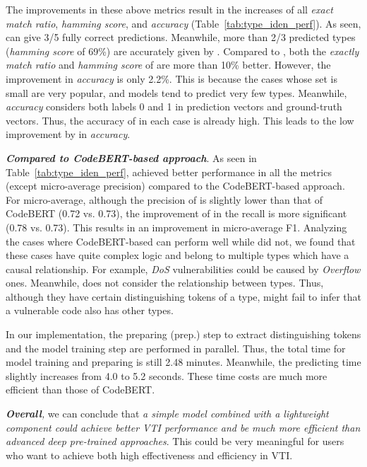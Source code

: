 The improvements in these above metrics result in the increases of all \textit{exact match ratio}, \textit{hamming score}, and \textit{accuracy} (Table~\ref{tab:type_iden_perf}).
%
As seen, \ebase can give 3/5 fully correct predictions. Meanwhile, more than 2/3 predicted types (\textit{hamming score} of 69\%) are accurately given by \ebase. Compared to \base, both the \textit{exactly match ratio} and \textit{hamming score} of \ebase are more than 10\% better. However, the improvement in \textit{accuracy} is only 2.2\%. This is because the cases whose \vt set is small are very popular, and models tend to predict very few types. Meanwhile, \textit{accuracy} considers both labels 0 and 1 in prediction vectors and ground-truth vectors. Thus, the accuracy of \base in each case is already high. This leads to the low improvement by \ebase in \textit{accuracy}.


\textbf{\textit{Compared to CodeBERT-based approach}}. As seen in Table~\ref{tab:type_iden_perf}, \ebase achieved better performance in all the metrics (except micro-average precision) compared to the CodeBERT-based approach. 
For micro-average, although the precision of \ebase is slightly lower than that of CodeBERT (0.72 vs. 0.73), the improvement of \ebase in the recall is more significant (0.78 vs. 0.73). This results in an improvement in micro-average F1. Analyzing the cases where CodeBERT-based can perform well while \ebase did not, we found that these cases have quite complex logic and belong to multiple types which have a causal relationship. For example, \textit{DoS} vulnerabilities could be caused by \textit{Overflow} ones. Meanwhile, \ebase does not consider the relationship between types. Thus, although they have certain distinguishing tokens of a type, \ebase might fail to infer that a vulnerable code also has other types.

In our implementation, the preparing (prep.) step to extract distinguishing tokens and the model training step are performed in parallel. Thus, the total time for model training and preparing is still 2.48 minutes. Meanwhile, the predicting time slightly increases from 4.0 to 5.2 seconds. These time costs are much more efficient than those of CodeBERT.  




\textit{\textbf{Overall},} we can conclude that \textit{a simple model combined with a lightweight component could achieve better VTI performance and be much more efficient than advanced deep pre-trained approaches}. This could be very meaningful for users who want to achieve both high effectiveness and efficiency in VTI.

